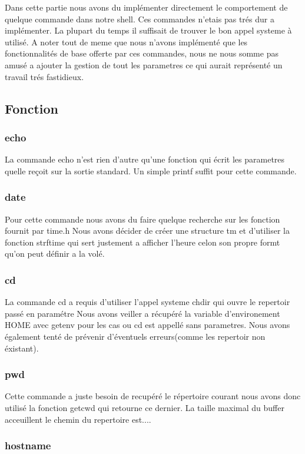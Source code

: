 \documentclass[12pt]{article}
\begin{document}
Dans cette partie nous avons du implémenter directement le comportement de quelque
commande dans notre shell. Ces commandes n'etais pas trés dur a implémenter. La plupart
du temps il suffisait de trouver le bon appel systeme à utilisé. A noter tout de meme
que nous n'avons implémenté que les fonctionnalités de base offerte par ces commandes, nous
ne nous somme pas amusé a ajouter la gestion de tout les parametres ce qui aurait 
représenté un travail trés fastidieux.

\subsection{Fonction}
\subsubsection{echo}
 La commande echo n'est rien d'autre qu'une fonction qui écrit les parametres quelle reçoit
 sur la sortie standard. Un simple printf suffit pour cette commande.
 
\subsubsection{date}
 Pour cette commande nous avons du faire quelque recherche sur les fonction fournit par time.h
 Nous avons décider de créer une structure tm et d'utiliser la fonction strftime qui
 sert justement a afficher l'heure celon son propre formt qu'on peut définir a la volé.
 
 \subsubsection{cd}
 La commande cd a requis d'utiliser l'appel systeme chdir qui ouvre le repertoir passé en paramétre
 Nous avons veiller a récupéré la variable d'environement HOME avec getenv pour les cas ou cd est
 appellé sans parametres. Nous avons également tenté de prévenir d'éventuels erreurs(comme les
 repertoir non éxistant).
 
 \subsubsection{pwd}
 Cette commande a juste besoin de recupéré le répertoire courant nous avons donc utilisé
 la fonction getcwd qui retourne ce dernier. La taille maximal du buffer acceuillent le chemin
 du repertoire est....
 
 \subsubsection{hostname}
 
\end{document}
